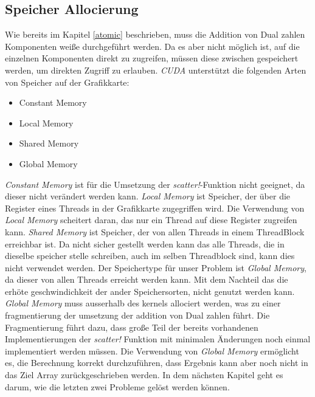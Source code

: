 \subsection{Speicher Allocierung} \label{memory}

Wie bereits im Kapitel \ref{atomic} beschrieben, 
muss die Addition von Dual zahlen Komponenten weiße durchgeführt werden.
Da es aber nicht möglich ist, auf die einzelnen Komponenten direkt zu zugreifen,
müssen diese zwischen gespeichert werden, um direkten Zugriff zu erlauben.
\textit{CUDA} unterstützt die folgenden Arten von Speicher auf der Grafikkarte:

\begin{itemize}
	\item Constant Memory
	\item Local Memory
	\item Shared Memory
	\item Global Memory
\end{itemize}

\textit{Constant Memory} ist für die Umsetzung der \textit{scatter!}-Funktion nicht geeignet,
da dieser nicht verändert werden kann.
\textit{Local Memory} ist Speicher, 
der über die Register eines Threads in der Grafikkarte zugegriffen wird.
Die Verwendung von \textit{Local Memory} scheitert daran, 
das nur ein Thread auf diese Register zugreifen kann.
\textit{Shared Memory} ist Speicher, 
der von allen Threads in einem ThreadBlock erreichbar ist.
Da nicht sicher gestellt werden kann das alle Threads, 
die in dieselbe speicher stelle schreiben, auch im selben Threadblock sind,
kann dies nicht verwendet werden.
Der Speichertype für unser Problem ist \textit{Global Memory}, 
da dieser von allen Threads erreicht werden kann.
Mit dem Nachteil das die erhöte geschwindichkeit der ander Speichersorten, 
nicht genutzt werden kann.
\textit{Global Memory} muss ausserhalb des kernels allociert werden, 
was zu einer fragmentierung der umsetzung der addition von Dual zahlen führt.
Die Fragmentierung führt dazu, 
dass große Teil der bereits vorhandenen Implementierungen der \textit{scatter!} Funktion mit minimalen Änderungen noch einmal
implementiert werden müssen.
Die Verwendung von \textit{Global Memory} ermöglicht es, die Berechnung korrekt durchzuführen,
dass Ergebnis kann aber noch nicht in das Ziel Array zurückgeschrieben werden.
In dem nächsten Kapitel geht es darum, wie die letzten zwei Probleme gelöst werden können.
